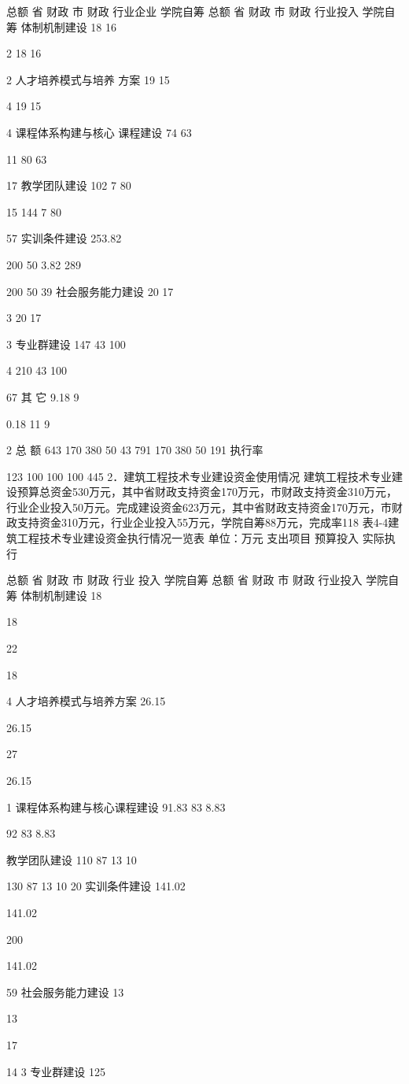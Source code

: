 总额
省
财政
市
财政
行业企业
学院自筹
总额
省
财政
市
财政
行业投入
学院自筹
体制机制建设
18
16


2
18
16


2
人才培养模式与培养
方案
19
15


4
19
15


4
课程体系构建与核心
课程建设
74
63


11
80
63


17
教学团队建设
102
7
80

15
144
7
80

57
实训条件建设
253.82

200
50
3.82
289

200
50
39
社会服务能力建设
20
17


3
20
17


3
专业群建设
147
43
100

4
210
43
100

67
其 它
9.18
9


0.18
11
9


2
总    额
643
170
380
50
43
791
170
380
50
191
执行率%

123
100
100
100
445
2．建筑工程技术专业建设资金使用情况
建筑工程技术专业建设预算总资金530万元，其中省财政支持资金170万元，市财政支持资金310万元，行业企业投入50万元。完成建设资金623万元，其中省财政支持资金170万元，市财政支持资金310万元，行业企业投入55万元，学院自筹88万元，完成率118%
表4-4建筑工程技术专业建设资金执行情况一览表
单位：万元
支出项目
预算投入
实际执行

总额
省
财政
市
财政
行业
投入
学院自筹
总额
省
财政
市
财政
行业投入
学院自筹
体制机制建设
18

18


22

18

4
人才培养模式与培养方案
26.15

26.15


27

26.15

1
课程体系构建与核心课程建设
91.83
83
8.83


92
83
8.83


教学团队建设
110
87
13
10

130
87
13
10
20
实训条件建设
141.02

141.02


200

141.02

59
社会服务能力建设
13


13

17


14
3
专业群建设
125

